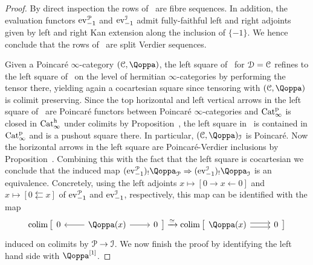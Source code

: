 \begin{proof}
By direct inspection the rows of~ are fibre sequences. In addition, the evaluation functors $\mathrm{ev}^{\mathcal{P}}_{-1}$ and $\mathrm{ev}^{\mathcal{I}}_{-1}$ admit fully-faithful left and right adjoints given by left and right Kan extension along the inclusion of $\{-1\}$. We hence conclude that the rows of~ are split Verdier sequences.

Given a Poincaré $\infty$-category $(\C,\QF)$, the left square of~ for $\mathcal{D}=\mathcal C$ refines to the left square of~ on the level of hermitian $\infty$-categories by performing the tensor there, yielding again a cocartesian square since tensoring with $(\C,\QF)$ is colimit preserving. Since the top horizontal and left vertical arrows in the left square of~ are Poincaré functors between Poincaré $\infty$-categories and $\mathrm{Cat}^{\mathrm p}_\infty$ is closed in $\mathrm{Cat}^\mathrm{h}_\infty$ under colimits by Proposition~, the left square in~ is contained in $\mathrm{Cat}^{\mathrm p}_\infty$ and is a pushout square there. In particular, $(\C,\QF)_\I$ is Poincaré.  
Now the horizontal arrows in the left square are Poincaré-Verdier inclusions by Proposition~.
Combining this with the fact that the left square is cocartesian we conclude that the induced map $(\ev^{\cP}_{-1})_!\QF_{\cP} \Rightarrow (\ev^{\I}_{-1})_!\QF_\I$ is an equivalence. 
Concretely, using the left adjoints $x \mapsto [0 \rightarrow x \leftarrow 0]$ and $x \mapsto [0 \leftleftarrows x]$ of $\mathrm{ev}^{\mathcal{P}}_{-1}$ and $\mathrm{ev}^{\mathcal{I}}_{-1}$, respectively, this map can be identified with the map
\[
\colim\big[\begin{tikzcd}
0 & \QF(x) \ar[r]\ar[l] & 0 
\end{tikzcd}\big] \xrightarrow{\simeq}
\colim\big[\begin{tikzcd}
\QF(x) \ar[r,shift right]\ar[r,shift left] & 0 
\end{tikzcd}\big] 
\]
induced on colimits by $\mathcal{P} \to \mathcal{I}$. We now finish the proof by identifying the left hand side with $\QF\qshift{1}$.
\end{proof}

